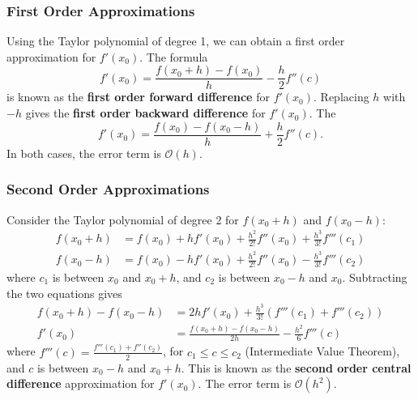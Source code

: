 \documentclass{article}
\begin{document}
\subsubsection{First Order Approximations}
Using the Taylor polynomial of degree 1, we can obtain a first order approximation for \(f'\left( x_0 \right)\).
The formula
\begin{equation*}
    f'\left( x_0 \right) = \frac{f\left( x_0 + h \right) - f\left( x_0 \right)}{h} - \frac{h}{2} f''\left( c \right)
\end{equation*}
is known as the \textbf{first order forward difference} for \(f'\left( x_0 \right)\). Replacing
\(h\) with \(-h\) gives the \textbf{first order backward difference} for \(f'\left( x_0 \right)\). The
\begin{equation*}
    f'\left( x_0 \right) = \frac{f\left( x_0 \right) - f\left( x_0 - h \right)}{h} + \frac{h}{2} f''\left( c \right).
\end{equation*}
In both cases, the error term is \(\mathcal{O}\left( h \right)\).
\subsubsection{Second Order Approximations}
Consider the Taylor polynomial of degree 2 for \(f\left( x_0 + h \right)\) and \(f\left( x_0 - h \right)\):
\begin{align*}
    f\left( x_0 + h \right) & = f\left( x_0 \right) + h f'\left( x_0 \right) + \frac{h^2}{2!} f''\left( x_0 \right) + \frac{h^3}{3!} f'''\left( c_1 \right) \\
    f\left( x_0 - h \right) & = f\left( x_0 \right) - h f'\left( x_0 \right) + \frac{h^2}{2!} f''\left( x_0 \right) - \frac{h^3}{3!} f'''\left( c_2 \right)
\end{align*}
where \(c_1\) is between \(x_0\) and \(x_0 + h\), and \(c_2\) is between \(x_0 - h\) and \(x_0\).
Subtracting the two equations gives
\begin{align*}
    f\left( x_0 + h \right) - f\left( x_0 - h \right) & = 2h f'\left( x_0 \right) + \frac{h^3}{3!} \left( f'''\left( c_1 \right) + f'''\left( c_2 \right) \right) \\
    f'\left( x_0 \right)                              & = \frac{f\left( x_0 + h \right) - f\left( x_0 - h \right)}{2h} - \frac{h^2}{6} f'''\left( c \right)
\end{align*}
where \(f'''\left( c \right) = \frac{f'''\left( c_1 \right) + f''\left( c_2 \right)}{2}\), for \(c_1 \leq c \leq c_2\) (Intermediate Value Theorem),
and \(c\) is between \(x_0 - h\) and \(x_0 + h\).
This is known as the \textbf{second order central difference} approximation for \(f'\left( x_0 \right)\). The error term is \(\mathcal{O}\left( h^2 \right)\).
\end{document}
